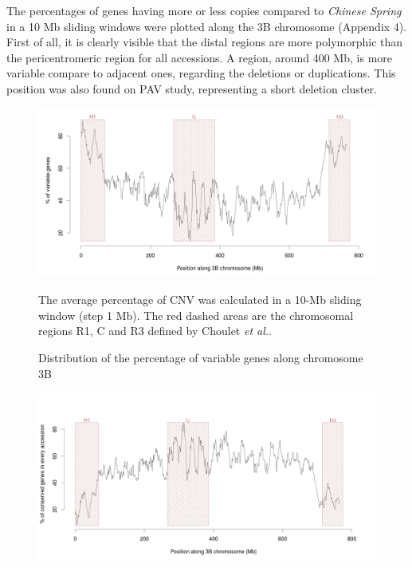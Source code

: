 \documentclass[a4paper, 12pt]{article}
\begin{document}
\begin{onehalfspace}
The percentages of genes having more or less copies compared to \textit{Chinese Spring} in a 10 Mb sliding windows were plotted along the 3B chromosome (Appendix 4). First of all, it is clearly visible that the distal regions are more polymorphic than the pericentromeric region for all accessions. A region, around 400 Mb, is more variable compare to adjacent ones, regarding the deletions or duplications. This position was also found on PAV study, representing a short deletion cluster. 

\newpage 
\thispagestyle{empty}
    \begin{figure}
    \vspace{-2cm}
      \centering \includegraphics[scale=0.19]{Figures/Figure_16.jpg}
      \vspace{0.5cm}
      \caption{Distribution of the percentage of variable genes along chromosome 3B} 
      \label{fig:F16}
    \footnotesize{The average percentage of CNV was calculated in a 10-Mb sliding window (step 1 Mb).  The red dashed areas are the chromosomal regions R1, C and R3 defined by Choulet \textit{et al.}.}
    \end{figure}
    \begin{figure}
    \vspace{-1cm}
      \centering \includegraphics[scale=0.19]{Figures/Figure_17.jpg}

\end{figure}
\end{onehalfspace}
\end{document}
